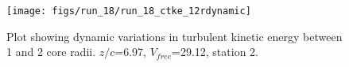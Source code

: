 \begin{figure}[H]
\centering
\texttt{[image: figs/run\_18/run\_18\_ctke\_12rdynamic]}
\caption{Plot showing dynamic variations in turbulent kinetic energy between 1 and 2 core radii. $z/c$=6.97, $V_{free}$=29.12, station 2.}
\label{fig:run_18_ctke_12rdynamic}
\end{figure}


